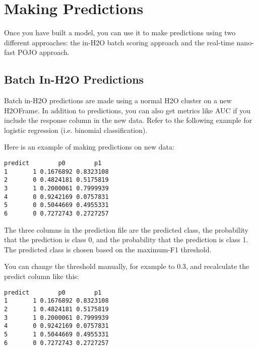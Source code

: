 
\section{Making Predictions}

Once you have built a model, you can use it to make predictions using two different approaches:  the in-H2O batch
scoring approach and the real-time nano-fast POJO approach.

\subsection{Batch In-H2O Predictions}

Batch in-H2O predictions are made using a normal H2O cluster on a new H2OFrame.  In addition to predictions, you
can also get metrics like AUC if you include the response column in the new data.  Refer to the following example for logistic regression (i.e. binomial classification).

\bigskip
\waterExampleInR



Here is an example of making predictions on new data:


\begin{lstlisting}[style=output]
  predict        p0        p1
1       1 0.1676892 0.8323108
2       0 0.4824181 0.5175819
3       1 0.2000061 0.7999939
4       0 0.9242169 0.0757831
5       0 0.5044669 0.4955331
6       0 0.7272743 0.2727257
\end{lstlisting}

The three columns in the prediction file are the predicted class, the probability that the prediction is class 0,
and the probability that the prediction is class 1. The predicted class is chosen based on the maximum-F1 threshold.

You can change the threshold manually, for example to 0.3, and recalculate the predict column like this:


\begin{lstlisting}[style=output]
  predict        p0        p1
1       1 0.1676892 0.8323108
2       1 0.4824181 0.5175819
3       1 0.2000061 0.7999939
4       0 0.9242169 0.0757831
5       1 0.5044669 0.4955331
6       0 0.7272743 0.2727257
\end{lstlisting}

